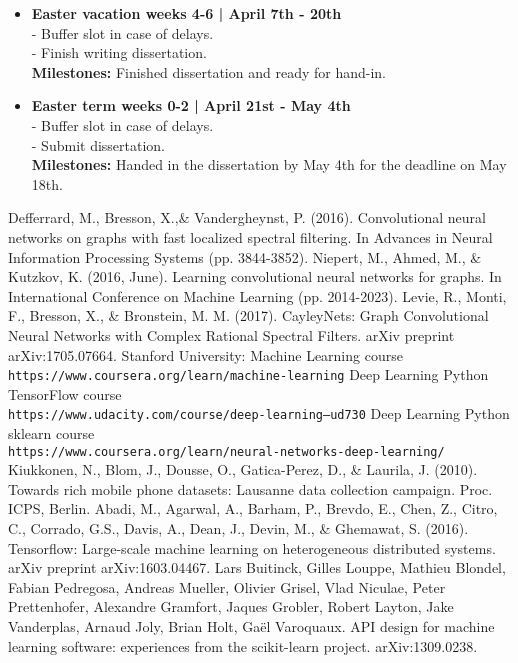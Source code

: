 \documentclass[12pt,a4paper,twoside]{article}
\begin{document}
\begin{itemize}
\item \textbf{Easter vacation weeks 4-6 | April 7th - 20th}\\
-  Buffer slot in case of delays.\\
- Finish writing dissertation.\\
\textbf{Milestones: }Finished dissertation and ready for hand-in.
\item \textbf{Easter term weeks 0-2 | April 21st - May 4th}\\
- Buffer slot in case of delays.\\
- Submit dissertation.\\
\textbf{Milestones: }Handed in the dissertation by May 4th for the deadline on May 18th.
\end{itemize}
\begin{thebibliography}{9}
 Defferrard, M., Bresson, X.,\& Vandergheynst, P. (2016). Convolutional neural networks on graphs with fast localized spectral filtering. In Advances in Neural Information Processing Systems (pp. 3844-3852).
 Niepert, M., Ahmed, M.,
\& Kutzkov, K. (2016, June). Learning convolutional neural networks for graphs. In International Conference on Machine Learning (pp. 2014-2023).
 Levie, R., Monti, F., Bresson, X., \& Bronstein, M. M. (2017). CayleyNets: Graph Convolutional Neural Networks with Complex Rational Spectral Filters. arXiv preprint arXiv:1705.07664.
 Stanford University: Machine Learning course \\\texttt{https://www.coursera.org/learn/machine-learning}
 Deep Learning Python TensorFlow course 
\\\texttt{https://www.udacity.com/course/deep-learning--ud730}
 Deep Learning Python sklearn course 
\\\texttt{https://www.coursera.org/learn/neural-networks-deep-learning/}
 Kiukkonen, N., Blom, J., Dousse, O., Gatica-Perez, D., \& Laurila, J. (2010). Towards rich mobile phone datasets: Lausanne data collection campaign. Proc. ICPS, Berlin.
Abadi, M., Agarwal, A., Barham, P., Brevdo, E., Chen, Z., Citro, C., Corrado, G.S., Davis, A., Dean, J., Devin, M., \& Ghemawat, S. (2016). Tensorflow: Large-scale machine learning on heterogeneous distributed systems. arXiv preprint arXiv:1603.04467.
 Lars Buitinck, Gilles Louppe, Mathieu Blondel, Fabian Pedregosa, Andreas Mueller, Olivier Grisel, Vlad Niculae, Peter Prettenhofer, Alexandre Gramfort, Jaques Grobler, Robert Layton, Jake Vanderplas, Arnaud Joly, Brian Holt, Gaël Varoquaux. API design for machine learning software: experiences from the scikit-learn project. arXiv:1309.0238.

\end{thebibliography}
\end{document}
